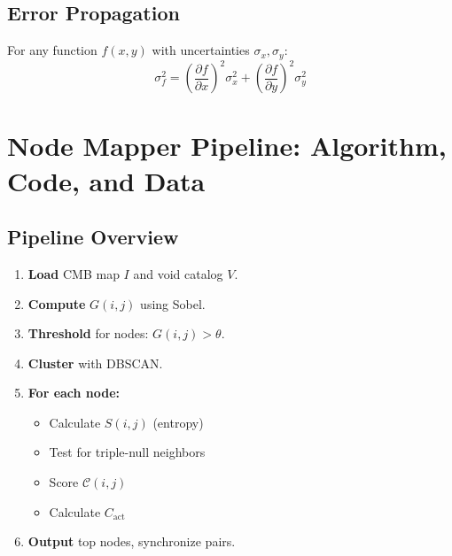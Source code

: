 \documentclass[12pt]{article}
\begin{document}
\subsection{Error Propagation}
For any function $f(x,y)$ with uncertainties $\sigma_x, \sigma_y$:
\begin{equation}
\sigma_f^2 = \left( \frac{\partial f}{\partial x} \right)^2 \sigma_x^2 + \left( \frac{\partial f}{\partial y} \right)^2 \sigma_y^2
\end{equation}

\newpage
\section{Node Mapper Pipeline: Algorithm, Code, and Data}

\subsection{Pipeline Overview}
\begin{enumerate}
    \item \textbf{Load} CMB map $I$ and void catalog $V$.
    \item \textbf{Compute} $G(i,j)$ using Sobel.
    \item \textbf{Threshold} for nodes: $G(i,j) > \theta$.
    \item \textbf{Cluster} with DBSCAN.
    \item \textbf{For each node:}
    \begin{itemize}
        \item Calculate $S(i,j)$ (entropy)
        \item Test for triple-null neighbors
        \item Score $\mathcal{C}(i,j)$
        \item Calculate $C_{\text{act}}$
    \end{itemize}
    \item \textbf{Output} top nodes, synchronize pairs.
\end{enumerate}
\end{document}
